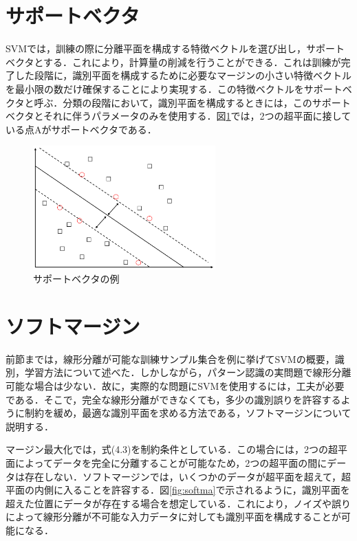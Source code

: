 \section{サポートベクタ}
SVMでは，訓練の際に分離平面を構成する特徴ベクトルを選び出し，サポートベクタとする．これにより，計算量の削減を行うことができる．これは訓練が完了した段階に，識別平面を構成するために必要なマージンの小さい特徴ベクトルを最小限の数だけ確保することにより実現する．この特徴ベクトルをサポートベクタと呼ぶ．分類の段階において，識別平面を構成するときには，このサポートベクタとそれに伴うパラメータのみを使用する．図\ref{fig:sapo}では，2つの超平面に接している点Aがサポートベクタである．

\begin{figure}[htbp]
  \begin{center}
    \includegraphics[clip,width=7.0cm]{./images/sapo.png}
    \caption{サポートベクタの例}
    \label{fig:sapo}
  \end{center}
\end{figure}

\newpage

\section{ソフトマージン}
前節までは，線形分離が可能な訓練サンプル集合を例に挙げてSVMの概要，識別，学習方法について述べた．しかしながら，パターン認識の実問題で線形分離可能な場合は少ない．故に，実際的な問題にSVMを使用するには，工夫が必要である．そこで，完全な線形分離ができなくても，多少の識別誤りを許容するように制約を緩め，最適な識別平面を求める方法である，ソフトマージンについて説明する．

マージン最大化では，式(4.3)を制約条件としている．この場合には，2つの超平面によってデータを完全に分離することが可能なため，2つの超平面の間にデータは存在しない．ソフトマージンでは，いくつかのデータが超平面を超えて，超平面の内側に入ることを許容する．図\ref{fig:softma}で示されるように，識別平面を超えた位置にデータが存在する場合を想定している．これにより，ノイズや誤りによって線形分離が不可能な入力データに対しても識別平面を構成することが可能になる．

